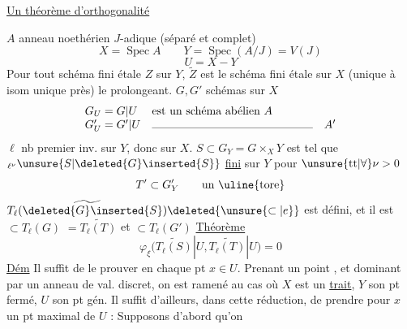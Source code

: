 \uline{Un théorème d'orthogonalité}

$A$ anneau noethérien $J$-adique (séparé et complet)
\[
X=\operatorname{Spec}A\qquad
Y=\operatorname{Spec}(A/J)=V(J)
\]
\[
U=X-Y
\]
Pour tout schéma fini étale $Z$ sur $Y$, $\widetilde Z$ est le schéma fini étale sur $X$ (unique à isom unique près) le prolongeant.
$G,G'$ schémas    sur $X$ 
\[
\begin{array}{ll}
G_U=G|U&\text{est un schéma abélien }A\\
G'_U=G'|U&\text{\rule{5cm}{.3pt}}\quad A'
\end{array}
\]
$\ell$  nb premier inv. sur $Y$, donc sur $X$.
$S\subset G_Y=G\times_XY$ est  tel que ${}_{\ell^\nu}\unsure{S|\deleted{G}\inserted{S}}$ \uline{fini} sur $Y$ pour $\unsure{\mathrm{tt}|\forall}\nu>0$
\[
T'\subset G'_Y\qquad\text{un \uline{tore}}
\]
$\widetilde{T_\ell(\deleted{G}\inserted{S})}\deleted{\unsure{\subset|e}}$ est défini, et il est $\subset T_\ell(G)$
 $=\widetilde{T_\ell(T)}$  et $\subset T_\ell(G')$
\uline{Théorème}
\[
\varphi_\xi\bigl(\widetilde{T_\ell(S)}|U,\widetilde{T_\ell(T)}|U\bigr)=0
\]
 \uline{Dém} Il suffit de le prouver en chaque pt $x\in U$.
Prenant un point  , et dominant par un anneau de val. discret, on est ramené au cas où $X$ est un \uline{trait}, $Y$ son pt fermé, $U$ son pt gén. Il suffit d'ailleurs, dans cette réduction, de prendre pour $x$ un pt maximal de $U$ : Supposons  d'abord qu'on
